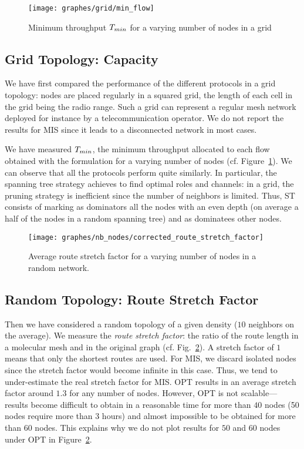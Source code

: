 \documentclass[twoside]{article}
\begin{document}
\begin{figure}[!h]
\centering
	\texttt{[image: graphes/grid/min\_flow]}        
	\caption{Minimum throughput $T_{min}$ for a varying number
          of nodes in a grid}
\label{fig:grid-min_flow}
\end{figure}

\subsection{Grid Topology: Capacity}

We have first compared the performance of the different protocols in a
grid topology: nodes are placed regularly in a squared grid, the
length of each cell in the grid being the radio range. Such a grid can
represent a regular mesh network deployed for instance by a
telecommunication operator. We do not report the results for MIS since
it leads to a disconnected network in most cases.

We have measured $T_{min}$, the minimum throughput allocated to
each flow obtained with the \milp formulation for a varying number of
nodes (cf. Figure~\ref{fig:grid-min_flow}). We can observe that all
the protocols perform quite similarly. In particular, the spanning
tree strategy achieves to find optimal roles and channels: in a grid,
the pruning strategy is inefficient since the number of neighbors
is limited. Thus, ST consists of marking as dominators all the nodes
with an even depth (on average a half of the nodes in a random
spanning tree) and as dominatees other nodes.


\begin{figure}[!h]
\centering
	\texttt{[image: graphes/nb\_nodes/corrected\_route\_stretch\_factor]}        
	\caption{Average route stretch factor for a varying number of
          nodes in a random network.}
\label{fig:nb_nodes-route_stretch_factor}
\end{figure}

\subsection{Random Topology: Route Stretch Factor}

Then we have considered a random topology of a given density ($10$ neighbors
on the average). We measure the {\em route stretch factor}: the ratio
of the route length in a molecular mesh and in the original graph
(cf. Fig.~\ref{fig:nb_nodes-route_stretch_factor}). A stretch factor
of $1$ means that only the shortest routes are used. For MIS, we
discard isolated nodes since the stretch factor would become infinite
in this case. Thus, we tend to under-estimate the real stretch factor
for MIS.  OPT results in an average stretch
factor around $1.3$ for any number of nodes. However, OPT is not
scalable---results become difficult to obtain in a reasonable time for
more than $40$ nodes (50 nodes require more than 3 hours) and almost
impossible to be obtained for more than $60$ nodes. This explains why
we do not plot results for $50$ and $60$ nodes under OPT in
Figure~\ref{fig:nb_nodes-route_stretch_factor}.
\end{document}
